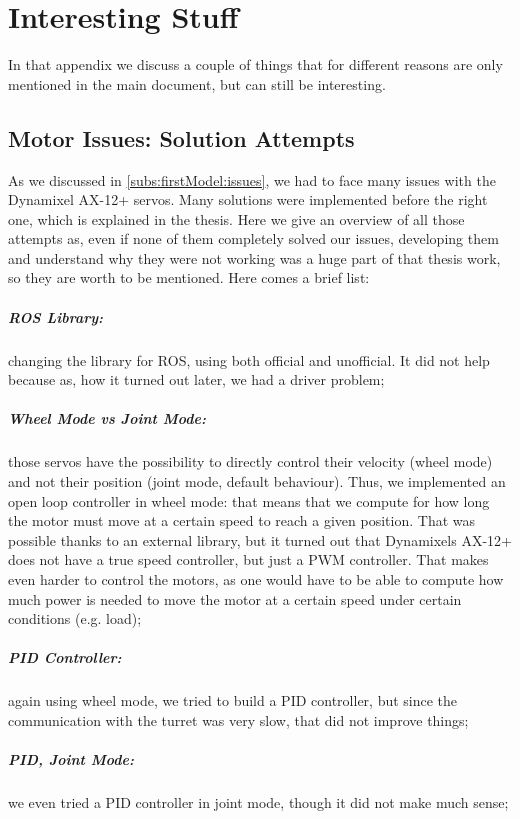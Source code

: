 \chapter{Interesting Stuff}
\label{Appen:A}
In that appendix we discuss a couple of things that for different reasons are only mentioned in the main document, but can still be interesting.
\section{Motor Issues: Solution Attempts}
As we discussed in \ref{subs:firstModel:issues}, we had to face many issues with the Dynamixel AX-12+ servos. Many solutions were implemented before the right one, which is explained in the thesis. Here we give an overview of all those attempts as, even if none of them completely solved our issues, developing them and understand why they were not working was a huge part of that thesis work, so they are worth to be mentioned. Here comes a brief list:
\paragraph{ROS Library:} changing the library for ROS, using both official and unofficial. It did not help because as, how it turned out later, we had a driver problem;
\paragraph{Wheel Mode vs Joint Mode:} those servos have the possibility to directly control their velocity (wheel mode) and not their position (joint mode, default behaviour). Thus, we implemented an open loop controller in wheel mode: that means that we compute for how long the motor must move at a certain speed to reach a given position. That was possible thanks to an external library, but it turned out that Dynamixels AX-12+ does not have a true speed controller, but just a PWM controller. That makes even harder to control the motors, as one would have to be able to compute how much power is needed to move the motor at a certain speed under certain conditions (e.g. load);
\paragraph{PID Controller:} again using wheel mode, we tried to build a PID controller, but since the communication with the turret was very slow, that did not improve things;
\paragraph{PID, Joint Mode:} we even tried a PID controller in joint mode, though it did not make much sense;
